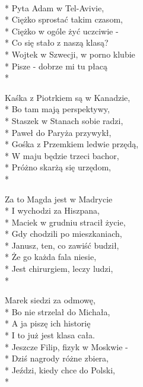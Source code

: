 
\begin{lyrics}[longestline={Gdy wśród tych - nieobcych - twarzy}]

\\*
Pyta Adam w Tel-Avivie,\\*
Ciężko sprostać takim czasom,\\*
Ciężko w ogóle żyć uczciwie -\\*
Co się stało z naszą klasą?\\*
Wojtek w Szwecji, w porno klubie\\*
Pisze - dobrze mi tu płacą\\*

Kaśka z Piotrkiem są w Kanadzie,\\*
Bo tam mają perspektywy,\\*
Staszek w Stanach sobie radzi,\\*
Paweł do Paryża przywykł,\\*
Gośka z Przemkiem ledwie przędą,\\*
W maju będzie trzeci bachor,\\*
Próżno skarżą się urzędom,\\*

Za to Magda jest w Madrycie\\*
I wychodzi za Hiszpana,\\*
Maciek w grudniu stracił życie,\\*
Gdy chodzili po mieszkaniach,\\*
Janusz, ten, co zawiść budził,\\*
Że go każda fala niesie,\\*
Jest chirurgiem, leczy ludzi,\\*

Marek siedzi za odmowę,\\*
Bo nie strzelał do Michała,\\*
A ja piszę ich historię\\*
I to już jest klasa cała.\\*
Jeszcze Filip, fizyk w Moskwie -\\*
Dziś nagrody różne zbiera,\\*
Jeździ, kiedy chce do Polski,\\*


\end{lyrics}
